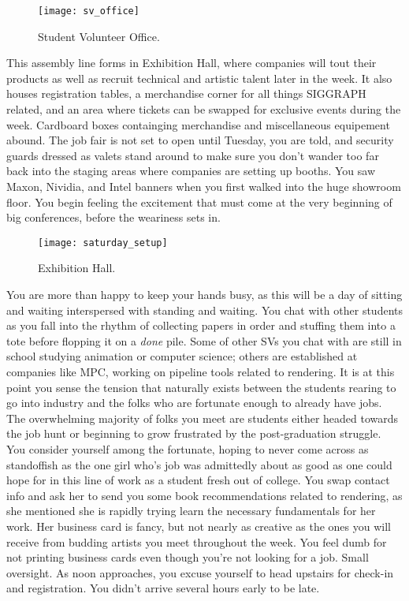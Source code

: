 \documentclass[../main.tex]{subfiles}
\begin{document}
\begin{figure}[h]
	\centering
	\texttt{[image: sv\_office]}
	\caption*{Student Volunteer Office.}
\end{figure}

This assembly line forms in Exhibition Hall, where companies will tout their products as well as recruit technical and artistic talent later in the week. It also houses registration tables, a merchandise corner for all things SIGGRAPH related, and an area where tickets can be swapped for exclusive events during the week. Cardboard boxes containging merchandise and miscellaneous equipement abound. The job fair is not set to open until Tuesday, you are told, and security guards dressed as valets stand around to make sure you don't wander too far back into the staging areas where companies are setting up booths. You saw Maxon, Nividia, and Intel banners when you first walked into the huge showroom floor. You begin feeling the excitement that must come at the very beginning of big conferences, before the weariness sets in.

\begin{figure}[h]
	\centering
	\texttt{[image: saturday\_setup]}
	\caption*{Exhibition Hall.}
\end{figure}

You are more than happy to keep your hands busy, as this will be a day of sitting and waiting interspersed with standing and waiting. You chat with other students as you fall into the rhythm of collecting papers in order and stuffing them into a tote before flopping it on a \textit{done} pile. Some of other SVs you chat with are still in school studying animation or computer science; others are established at companies like MPC, working on pipeline tools related to rendering. It is at this point you sense the tension that naturally exists between the students rearing to go into industry and the folks who are fortunate enough to already have jobs. The overwhelming majority of folks you meet are students either headed towards the job hunt or beginning to grow frustrated by the post-graduation struggle. You consider yourself among the fortunate, hoping to never come across as standoffish as the one girl who's job was admittedly about as good as one could hope for in this line of work as a student fresh out of college. You swap contact info and ask her to send you some book recommendations related to rendering, as she mentioned she is rapidly trying learn the necessary fundamentals for her work. Her business card is fancy, but not nearly as creative as the ones you will receive from budding artists you meet throughout the week. You feel dumb for not printing business cards even though you're not looking for a job. Small oversight. As noon approaches, you excuse yourself to head upstairs for check-in and registration. You didn't arrive several hours early to be late.
\end{document}
